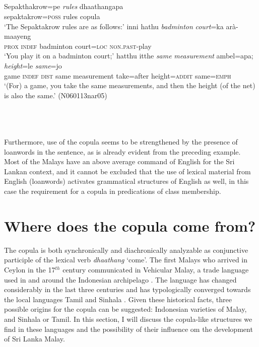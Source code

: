 \documentclass[a4paper,12pt]{article}
\newcommand{\xbox}[2]{\noindent\parbox[t]{#1}{#2}\noindent}
\newcommand{\trs}[2]{{\em #1\em} `#2'}
\newcommand{\ea}{\\\\}
\newcommand{\z}{\\\\}
\begin{document}
\xbox{\textwidth}{
\ea
\ea
\gll Sepakthakrow=pe     {\em rules} dhaathangapa \\
     sepaktakrow=\textsc{poss} rules copula  \\
    `The Sepaktakrow rules are as follows:' 
\ex
\gll  inni     hathu  {\em badminton} {\em court}=ka arà-maayeng\\
      \textsc{prox} \textsc{indef} badminton court=\textsc{loc} \textsc{non.past}-play \\
    `You play it on a badminton court;'  
\ex
\gll  {\em game} hatthu itthe  {\em same} {\em measurement} ambel=apa;     {\em height}=le      {\em same}=jo\\
      game \textsc{indef} \textsc{dist} same measurement take=after height=\textsc{addit} same=\textsc{emph} \\
    `(For) a game, you take the same measurements, and then the height (of the net) is also the same.' (N060113nar05)
\z
\z
} 



Furthermore, use of the copula seems to be strengthened by the presence of loanwords in the sentence, as is already evident from the preceding example. Most of the Malays have an above average command of English for the Sri Lankan context, and it cannot be excluded that the use of lexical material from English (loanwords) activates grammatical structures of English as well, in this case the requirement for a copula in predications of class membership.

\section{Where does the copula come from?}\label{sec:contactlgs}
The copula is both synchronically and diachronically analyzable as conjunctive participle of the lexical verb \trs{dhaathang}{come}. The first Malays who arrived in Ceylon in the 17$^{th}$ century communicated in Vehicular Malay, a trade language used in and around the Indonesian archipelago \citep{Smith2003timing, SmithEtAl2004}. The language has changed considerably in the last three centuries and has typologically converged towards the local languages Tamil and Sinhala \citep{SmithEtAl2004, SmithEtAl2006cll, Ansaldo2005ms, Ansaldo2008genesis,Nordhoff2009phd}. Given these historical facts, three possible origins for the copula can be suggested: Indonesian varieties of Malay, and Sinhala or Tamil. In this section, I will discuss the copula-like structures we find in these languages and the possibility of their influence om the development of Sri Lanka Malay.
\end{document}
